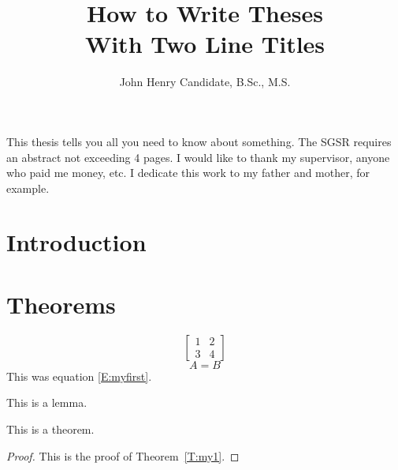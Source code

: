 \documentclass[12pt]{report}
\begin{document}
    \title{How to Write Theses\\
 	    With Two Line Titles}
    \author{John Henry Candidate, B.Sc., M.S.}
     \copyrightfalse %
    \figurespagefalse %
    \tablespagefalse  %
    \beforepreface
	This thesis tells you all you need to know about something.
	The SGSR requires an abstract not exceeding 4 pages.
	I would like to thank my supervisor, anyone who paid me money, etc.
	I dedicate this work to my father and mother, for example.
%
%
    \afterpreface   %
%
    \chapter{Introduction}
    \chapter{Theorems}
$$
\left[ \begin{matrix} 1 & 2 \\ 3 & 4 \end{matrix} \right]
$$
\begin{equation} \label{E:myfirst}
A = B
\end{equation}
This was equation \eqref{E:myfirst}.

\begin{lemma} 
This is a lemma.
\end{lemma}

\begin{theorem} \label{T:my1}
This is a theorem.
\end{theorem}

\begin{proof}
This is the proof of Theorem~\ref{T:my1}.
\end{proof}
\end{document}
